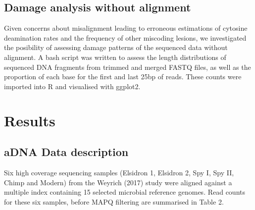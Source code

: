 \documentclass[12pt, a4paper]{article}
\begin{document}
\subsection{Damage analysis without alignment}
Given concerns about misalignment leading to erroneous estimations of cytosine deamination rates and the frequency of other miscoding lesions, we investigated the posibility of assessing damage patterns of the sequenced data without alignment. A bash script was written to assess the length distributions of sequenced DNA fragments from trimmed and merged FASTQ files, as well as the proportion of each base for the first and last 25bp of reads. These counts were imported into R and visualised with ggplot2.


\clearpage
\section{Results}\label{sec:results}


\subsection{aDNA Data description}\label{sssec:readCounts}
Six high coverage sequencing samples (Elsidron 1, Elsidron 2, Spy I, Spy II, Chimp and Modern) from the Weyrich (2017) study were aligned against a multiple index containing 15 selected microbial reference genomes. Read counts for these six samples, before MAPQ filtering are summarised in Table 2.
\\
\end{document}
